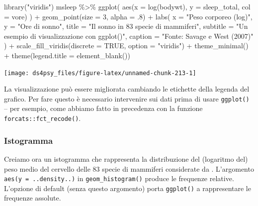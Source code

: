 \documentclass[
  11pt,
]{krantz}
\makeatletter
\newenvironment{Shaded}{\begin{snugshade}}{\end{snugshade}}
\newcommand{\AttributeTok}[1]{\textcolor[rgb]{0.61,0.61,0.61}{#1}}
\newcommand{\ConstantTok}[1]{\textcolor[rgb]{0,0,0}{#1}}
\newcommand{\DecValTok}[1]{\textcolor[rgb]{0.06,0.06,0.06}{#1}}
\newcommand{\FunctionTok}[1]{\textcolor[rgb]{0,0,0}{#1}}
\newcommand{\NormalTok}[1]{#1}
\newcommand{\SpecialCharTok}[1]{\textcolor[rgb]{0,0,0}{#1}}
\newcommand{\StringTok}[1]{\textcolor[rgb]{0.5,0.5,0.5}{#1}}
\newenvironment{kframe}{%
\medskip{}
\setlength{\fboxsep}{.8em}
 \def\at@end@of@kframe{}%
 \ifinner\ifhmode%
  \def\at@end@of@kframe{\end{minipage}}%
  \begin{minipage}{\columnwidth}%
 \fi\fi%
 \def\FrameCommand##1{\hskip\@totalleftmargin \hskip-\fboxsep
 \colorbox{shadecolor}{##1}\hskip-\fboxsep
     \hskip-\linewidth \hskip-\@totalleftmargin \hskip\columnwidth}%
 \MakeFramed {\advance\hsize-\width
   \@totalleftmargin\z@ \linewidth\hsize
   \@setminipage}}%
 {\par\unskip\endMakeFramed%
 \at@end@of@kframe}
\renewenvironment{Shaded}{\begin{kframe}}{\end{kframe}}
\theoremstyle{definition}
\theoremstyle{definition}
\theoremstyle{definition}
\theoremstyle{definition}
\theoremstyle{remark}
\makeatother
\begin{document}
\begin{Shaded}
\begin{Highlighting}[]
\FunctionTok{library}\NormalTok{(}\StringTok{"viridis"}\NormalTok{)}
\NormalTok{msleep }\SpecialCharTok{\%\textgreater{}\%}
  \FunctionTok{ggplot}\NormalTok{(}
    \FunctionTok{aes}\NormalTok{(}\AttributeTok{x =} \FunctionTok{log}\NormalTok{(bodywt), }\AttributeTok{y =}\NormalTok{ sleep\_total, }\AttributeTok{col =}\NormalTok{ vore)}
\NormalTok{  ) }\SpecialCharTok{+}
  \FunctionTok{geom\_point}\NormalTok{(}\AttributeTok{size =} \DecValTok{3}\NormalTok{, }\AttributeTok{alpha =}\NormalTok{ .}\DecValTok{8}\NormalTok{) }\SpecialCharTok{+}
  \FunctionTok{labs}\NormalTok{(}
    \AttributeTok{x =} \StringTok{"Peso corporeo (log)"}\NormalTok{,}
    \AttributeTok{y =} \StringTok{"Ore di sonno"}\NormalTok{,}
    \AttributeTok{title =} \StringTok{"Il sonno in 83 specie di mammiferi"}\NormalTok{,}
    \AttributeTok{subtitle =} \StringTok{"Un esempio di visualizzazione con ggplot()"}\NormalTok{,}
    \AttributeTok{caption =} \StringTok{"Fonte: Savage e West (2007)"}
\NormalTok{  ) }\SpecialCharTok{+}
  \FunctionTok{scale\_fill\_viridis}\NormalTok{(}\AttributeTok{discrete =} \ConstantTok{TRUE}\NormalTok{, }\AttributeTok{option =} \StringTok{"viridis"}\NormalTok{) }\SpecialCharTok{+}
  \FunctionTok{theme\_minimal}\NormalTok{() }\SpecialCharTok{+}
  \FunctionTok{theme}\NormalTok{(}\AttributeTok{legend.title =} \FunctionTok{element\_blank}\NormalTok{()) }
\end{Highlighting}
\end{Shaded}

\begin{center}\texttt{[image: ds4psy\_files/figure-latex/unnamed-chunk-213-1]} \end{center}

La visualizzazione può essere migliorata cambiando le etichette della legenda del grafico. Per fare questo è necessario intervenire sui dati prima di usare \texttt{ggplot()} -- per esempio, come abbiamo fatto in precedenza con la funzione \texttt{forcats::fct\_recode()}.

\hypertarget{istogramma}{%
\subsubsection{Istogramma}\label{istogramma}}

Creiamo ora un istogramma che rappresenta la distribuzione del (logaritmo del) peso medio del cervello delle 83 specie di mammiferi considerate da \citet{savage2007quantitative}. L'argomento \texttt{aes(y\ =\ ..density..)} in \texttt{geom\_histogram()} produce le frequenze relative. L'opzione di default (senza questo argomento) porta \texttt{ggplot()} a rappresentare le frequenze assolute.
\end{document}
